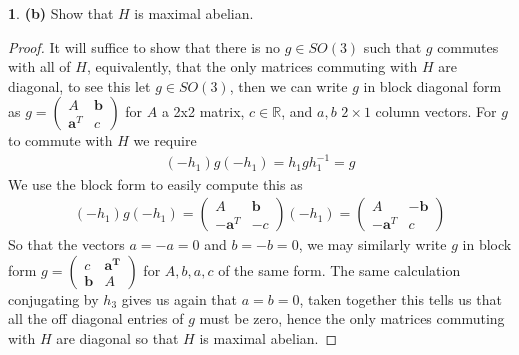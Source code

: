 \documentclass[10.5pt]{article}
\theoremstyle{definition}
\newtheorem{pb}{}
\begin{document}
\begin{pb}
        \textbf{(b)} Show that \(H\) is maximal abelian.
        \begin{proof}
            It will suffice to show that there is no \(g \in SO(3)\) such that \(g\) commutes with all of \(H\), equivalently, that the only matrices commuting with \(H\) are diagonal, to see this let \(g \in SO(3)\), then we can write \(g\) in block diagonal form as \(g = \begin{pmatrix} A & \mathbf{b} \\ \mathbf{a}^T & c \end{pmatrix}\) for \(A\) a 2x2 matrix, \(c \in \mathbb{R}\), and \(a,b\) \(2\times 1\) column vectors. For \(g\) to commute with \(H\) we require
            \begin{align*}
               ( -h_1) g (-h_1) =  h_1 g h_1^{-1} = g
            \end{align*}
            We use the block form to easily compute this as
            \begin{align*}
                ( -h_1) g (-h_1) = \begin{pmatrix} A & \mathbf{b} \\ -\mathbf{a}^T & -c \end{pmatrix} (-h_1) = \begin{pmatrix} A & -\mathbf{b} \\ -\mathbf{a}^T & c \end{pmatrix}
            \end{align*}
            So that the vectors \(a = -a = 0\) and \(b= -b = 0\), we may similarly write \(g\) in block form \(g = \begin{pmatrix} c  & \mathbf{a^T} \\ \mathbf{b} & A \end{pmatrix}\) for \(A,b,a,c\) of the same form. The same calculation conjugating by \(h_3\) gives us again that \(a = b = 0\), taken together this tells us that all the off diagonal entries of \(g\) must be zero, hence the only matrices commuting with \(H\) are diagonal so that \(H\) is maximal abelian.
        \end{proof}
    \end{pb}
\end{document}
